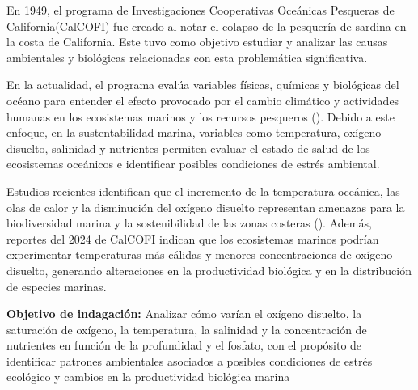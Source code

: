 
\tab En 1949, el programa de Investigaciones Cooperativas Oceánicas Pesqueras de California(CalCOFI) fue creado al  notar el colapso de la pesquería de sardina en la costa de California. Este tuvo como objetivo estudiar y analizar las causas ambientales y biológicas relacionadas con esta problemática significativa. 

En la actualidad, el programa evalúa variables físicas, químicas y biológicas del océano para entender el efecto provocado por el cambio climático y actividades humanas en los ecosistemas marinos y los recursos pesqueros (\cite{calcofi_conference}). Debido a este enfoque, en la sustentabilidad marina, variables como temperatura, oxígeno disuelto, salinidad y nutrientes permiten evaluar el estado de salud de los ecosistemas oceánicos e identificar posibles condiciones de estrés ambiental.

Estudios recientes identifican que el incremento de la temperatura oceánica, las olas de calor y la disminución del oxígeno disuelto representan amenazas para la biodiversidad marina y la sostenibilidad de las zonas costeras (\cite{sanderson_2024_missing_values}).  Además, reportes del 2024 de  CalCOFI indican que los ecosistemas marinos podrían experimentar temperaturas más cálidas y menores concentraciones de oxígeno disuelto, generando alteraciones en la productividad biológica y en la distribución de especies marinas.

\textbf{Objetivo de indagación:} Analizar cómo varían el oxígeno disuelto, la saturación de oxígeno, la temperatura, la salinidad y la concentración de nutrientes en función de la profundidad y el fosfato, con el propósito de identificar patrones ambientales asociados a posibles condiciones de estrés ecológico y cambios en la productividad biológica marina